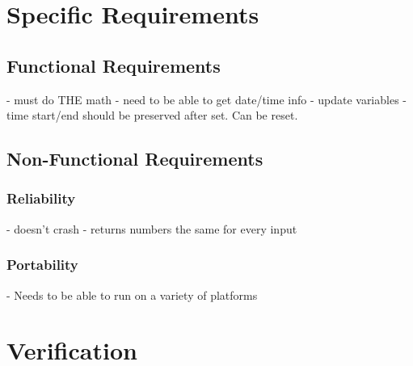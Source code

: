 \documentclass[10pt,draftclsnofoot,onecolumn]{IEEEtran}
\begin{document}
\section{Specific Requirements}

\subsection{Functional Requirements}
- must do THE math
- need to be able to get date/time info
- update variables
- time start/end should be preserved after set. Can be reset.

\subsection{Non-Functional Requirements}
\subsubsection{Reliability}
- doesn't crash
- returns numbers the same for every input
\subsubsection{Portability}
- Needs to be able to run on a variety of platforms

\section{Verification}
\end{document}
